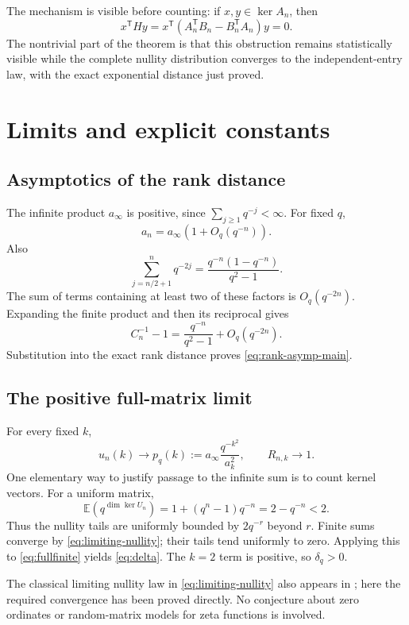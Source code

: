 \documentclass[11pt]{article}
\newcommand{\E}{\mathbb E}
\newcommand{\1}{\mathbf 1}
\theoremstyle{definition}
\theoremstyle{remark}
\numberwithin{equation}{section}
\begin{document}
The mechanism is visible before counting: if $x,y\in\ker A_n$, then
\[
x^{\mathsf T}Hy
=x^{\mathsf T}(A_n^{\mathsf T}B_n-B_n^{\mathsf T}A_n)y=0.
\]
The nontrivial part of the theorem is that this obstruction remains statistically visible while the complete nullity distribution converges to the independent-entry law, with the exact exponential distance just proved.

\section{Limits and explicit constants}
\subsection{Asymptotics of the rank distance}
The infinite product $a_\infty$ is positive, since $\sum_{j\ge1}q^{-j}<\infty$. For fixed $q$,
\[
a_n=a_\infty(1+O_q(q^{-n})).
\]
Also
\[
\sum_{j=n/2+1}^{n}q^{-2j}
=\frac{q^{-n}(1-q^{-n})}{q^2-1}.
\]
The sum of terms containing at least two of these factors is $O_q(q^{-2n})$. Expanding the finite product and then its reciprocal gives
\[
C_n^{-1}-1=\frac{q^{-n}}{q^2-1}+O_q(q^{-2n}).
\]
Substitution into the exact rank distance proves \eqref{eq:rank-asymp-main}.

\subsection{The positive full-matrix limit}
For every fixed $k$,
\begin{equation}\label{eq:limiting-nullity}
u_n(k)\longrightarrow p_q(k):=a_\infty\frac{q^{-k^2}}{a_k^2},
\qquad R_{n,k}\longrightarrow1.
\end{equation}
One elementary way to justify passage to the infinite sum is to count kernel vectors. For a uniform matrix,
\begin{equation}\label{eq:uniform-firstmoment}
\E(q^{\dim\ker U_n})=1+(q^n-1)q^{-n}=2-q^{-n}<2.
\end{equation}
Thus the nullity tails are uniformly bounded by $2q^{-r}$ beyond $r$. Finite sums converge by \eqref{eq:limiting-nullity}; their tails tend uniformly to zero. Applying this to \eqref{eq:fullfinite} yields \eqref{eq:delta}. The $k=2$ term is positive, so $\delta_q>0$.

The classical limiting nullity law in \eqref{eq:limiting-nullity} also appears in \cite{fulman}; here the required convergence has been proved directly. No conjecture about zero ordinates or random-matrix models for zeta functions is involved.
\end{document}
